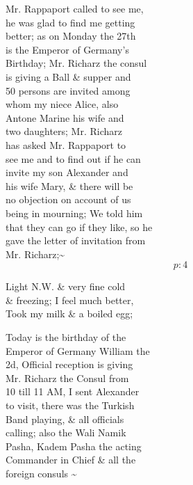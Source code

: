 \documentclass{report}
\begin{document}
	\par{
 	Mr. Rappaport called to see me,\ \\he was glad to find me getting\ \\better; as on Monday the 27th\ \\is the Emperor of Germany’s\ \\Birthday; Mr. Richarz the consul\ \\is giving a Ball \& supper and\ \\50 persons are invited among\ \\whom my niece Alice, also\ \\Antone Marine his wife and\ \\two daughters; Mr. Richarz\ \\has asked Mr. Rappaport to\ \\see me and to find out if he can\ \\invite my son Alexander and\ \\his wife Mary, \& there will be\ \\no objection on account of us\ \\being in mourning; We told him\ \\that they can go if they like, so he\ \\gave the letter of invitation from\ \\Mr. Richarz;\~{}\ \\
  \[p: 4 \]

	}




	\par{
 	Light N.W. \& very fine cold\ \\\& freezing; I feel much better,\ \\Took my milk \& a boiled egg;\ \\
	}


	\par{
 	Today is the birthday of the\ \\Emperor of Germany William the\ \\2d, Official reception is giving\ \\Mr. Richarz the Consul from\ \\10 till 11 AM, I sent Alexander\ \\to visit, there was the Turkish\ \\Band playing, \& all officials\ \\calling; also the Wali Namik\ \\Pasha, Kadem Pasha the acting\ \\Commander in Chief \& all the\ \\foreign consuls \~{}\ \\
	}
\end{document}
